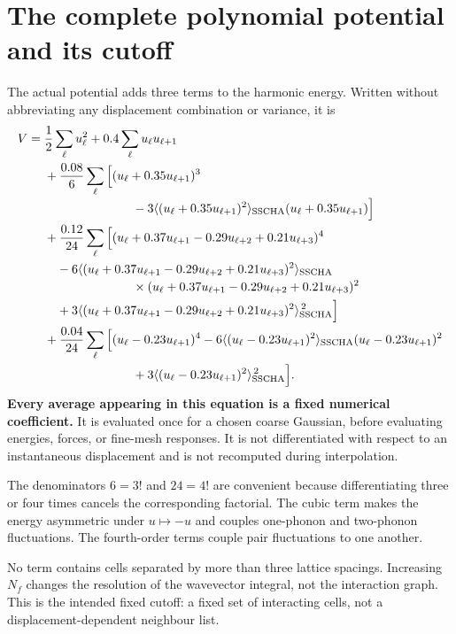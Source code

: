 \documentclass[11pt,a4paper]{article}
\newcommand{\pageheading}[1]{\clearpage\section{#1}}
\begin{document}
\pageheading{The complete polynomial potential and its cutoff}
The actual potential adds three terms to the harmonic energy. Written without
abbreviating any displacement combination or variance, it is
\begin{align}
 V={}&\frac12\sum_\ell u_\ell^2+0.4\sum_\ell u_\ell u_{\ell+1}\notag\\
 &+\frac{0.08}{6}\sum_\ell\Big[
 (u_\ell+0.35u_{\ell+1})^3\notag\\[-2pt]
 &\hspace{25mm}-3\langle(u_\ell+0.35u_{\ell+1})^2\rangle_{\rm SSCHA}
                   (u_\ell+0.35u_{\ell+1})\Big]\notag\\
 &+\frac{0.12}{24}\sum_\ell\Big[
 (u_\ell+0.37u_{\ell+1}-0.29u_{\ell+2}+0.21u_{\ell+3})^4\notag\\
 &\quad-6\langle(u_\ell+0.37u_{\ell+1}-0.29u_{\ell+2}+0.21u_{\ell+3})^2
                   \rangle_{\rm SSCHA}\notag\\[-2pt]
 &\hspace{25mm}\times(u_\ell+0.37u_{\ell+1}-0.29u_{\ell+2}+0.21u_{\ell+3})^2\notag\\
 &\quad+3\langle(u_\ell+0.37u_{\ell+1}-0.29u_{\ell+2}+0.21u_{\ell+3})^2
                   \rangle_{\rm SSCHA}^{\,2}\Big]\notag\\
 &+\frac{0.04}{24}\sum_\ell\Big[
 (u_\ell-0.23u_{\ell+1})^4
 -6\langle(u_\ell-0.23u_{\ell+1})^2\rangle_{\rm SSCHA}
          (u_\ell-0.23u_{\ell+1})^2\notag\\
 &\hspace{25mm}+3\langle(u_\ell-0.23u_{\ell+1})^2\rangle_{\rm SSCHA}^{\,2}\Big].
\end{align}
\textbf{Every average appearing in this equation is a fixed numerical coefficient.}
It is evaluated once for a chosen coarse Gaussian, before evaluating energies,
forces, or fine-mesh responses. It is not differentiated with respect to an
instantaneous displacement and is not recomputed during interpolation.

The denominators $6=3!$ and $24=4!$ are convenient because differentiating three
or four times cancels the corresponding factorial. The cubic term makes the
energy asymmetric under $u\mapsto-u$ and couples one-phonon and two-phonon
fluctuations. The fourth-order terms couple pair fluctuations to one another.

No term contains cells separated by more than three lattice spacings.
Increasing $N_f$ changes the resolution of the wavevector integral, not the
interaction graph. This is the intended fixed cutoff: a fixed set of interacting
cells, not a displacement-dependent neighbour list.
\end{document}
